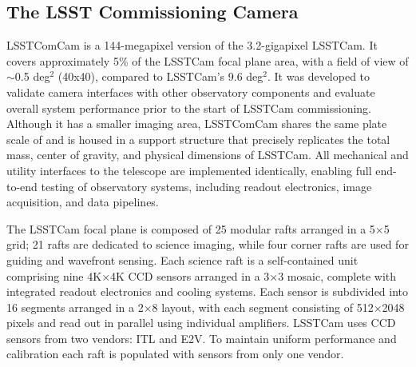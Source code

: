 \subsection{The LSST Commissioning Camera}
\label{ssec:comcam}
\gls{LSSTComCam} \citep{2022SPIE12184E..0JS,2020SPIE11447E..0LS,2018SPIE10700E..3DH, 10.71929/rubin/2561361} is a 144-megapixel version of the 3.2-gigapixel \gls{LSSTCam}.
It covers approximately 5\% of the \gls{LSSTCam} focal plane area, with a field of view of $\sim$0.5 deg$^2$   (40\arcmin x40\arcmin), compared to LSSTCam's 9.6 deg$^2$.
It was developed to validate camera interfaces with other observatory components and evaluate overall system performance prior to the start of \gls{LSSTCam} commissioning.
Although it has a smaller imaging area, \gls{LSSTComCam} shares the same plate scale of \rawplatescale and is housed in a support structure that precisely replicates the total mass, center of gravity, and physical dimensions of \gls{LSSTCam}.
All mechanical and utility interfaces to the telescope are implemented identically, enabling full end-to-end testing of observatory systems, including readout electronics, image acquisition, and data pipelines.

The \gls{LSSTCam} focal plane is composed  of 25 modular  \gls{raft}s arranged in a 5×5 grid; 21 \gls{raft}s are dedicated to science imaging, while four corner \gls{raft}s are used for guiding and wavefront sensing.
Each science \gls{raft} is a self-contained unit comprising nine 4K×4K \gls{CCD} \citep{RevModPhys.82.2307} sensors arranged in a 3×3 mosaic, complete with integrated readout electronics and cooling systems.
Each sensor is subdivided into 16 segments arranged in a 2×8 layout, with each segment consisting of 512×2048 pixels and read out in parallel using individual amplifiers.
\gls{LSSTCam} uses CCD sensors from two vendors: \gls{ITL} and \gls{E2V}.
To maintain uniform performance and \gls{calibration} each  \gls{raft} is populated with sensors from only one vendor.

